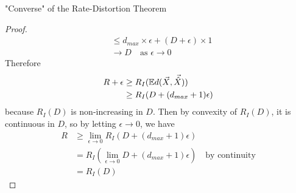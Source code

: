 \documentclass[../main.tex]{subfiles}
\begin{document}
\begin{bbox}{"Converse" of the Rate-Distortion Theorem}
\begin{proof}
\begin{align*}
            &\leq d_{max}\times \epsilon + (D+\epsilon) \times 1\\
            &\to D \quad \text{as $\epsilon \to 0$}
        \end{align*}
        Therefore \begin{align*}
            R+\epsilon &\geq R_I(\mathbb{E} d(\vec X, \vec{\hat X}))\\
            &\geq R_I(D+(d_{max} + 1)\epsilon)
        \end{align*}
        because $R_I(D)$ is non-increasing in $D.$
        \newline
        Then by convexity of $R_I(D)$, it is continuous in $D$, so by letting $\epsilon \to 0$, we have \begin{align*}
        R &\geq \lim_{\epsilon\to 0}R_I(D+(d_{max}+1)\epsilon)\\
        &= R_I(\lim_{\epsilon\to 0} D+(d_{max}+1)\epsilon) \quad \text{by continuity}\\
        &= R_I(D)
        \end{align*}
    \end{proof}
\end{bbox}
\end{document}
